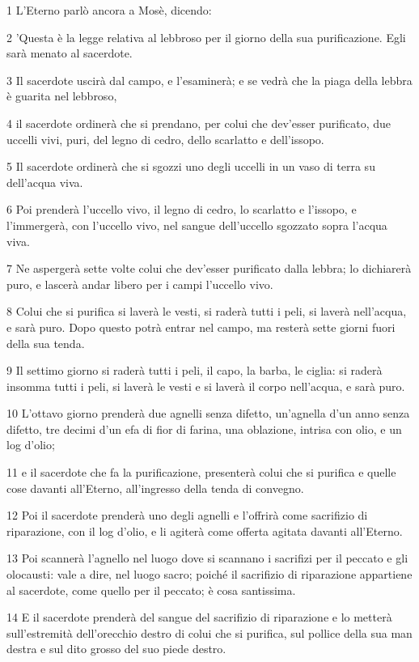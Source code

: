 \par 1 L'Eterno parlò ancora a Mosè, dicendo:
\par 2 'Questa è la legge relativa al lebbroso per il giorno della sua purificazione. Egli sarà menato al sacerdote.
\par 3 Il sacerdote uscirà dal campo, e l'esaminerà; e se vedrà che la piaga della lebbra è guarita nel lebbroso,
\par 4 il sacerdote ordinerà che si prendano, per colui che dev'esser purificato, due uccelli vivi, puri, del legno di cedro, dello scarlatto e dell'issopo.
\par 5 Il sacerdote ordinerà che si sgozzi uno degli uccelli in un vaso di terra su dell'acqua viva.
\par 6 Poi prenderà l'uccello vivo, il legno di cedro, lo scarlatto e l'issopo, e l'immergerà, con l'uccello vivo, nel sangue dell'uccello sgozzato sopra l'acqua viva.
\par 7 Ne aspergerà sette volte colui che dev'esser purificato dalla lebbra; lo dichiarerà puro, e lascerà andar libero per i campi l'uccello vivo.
\par 8 Colui che si purifica si laverà le vesti, si raderà tutti i peli, si laverà nell'acqua, e sarà puro. Dopo questo potrà entrar nel campo, ma resterà sette giorni fuori della sua tenda.
\par 9 Il settimo giorno si raderà tutti i peli, il capo, la barba, le ciglia: si raderà insomma tutti i peli, si laverà le vesti e si laverà il corpo nell'acqua, e sarà puro.
\par 10 L'ottavo giorno prenderà due agnelli senza difetto, un'agnella d'un anno senza difetto, tre decimi d'un efa di fior di farina, una oblazione, intrisa con olio, e un log d'olio;
\par 11 e il sacerdote che fa la purificazione, presenterà colui che si purifica e quelle cose davanti all'Eterno, all'ingresso della tenda di convegno.
\par 12 Poi il sacerdote prenderà uno degli agnelli e l'offrirà come sacrifizio di riparazione, con il log d'olio, e li agiterà come offerta agitata davanti all'Eterno.
\par 13 Poi scannerà l'agnello nel luogo dove si scannano i sacrifizi per il peccato e gli olocausti: vale a dire, nel luogo sacro; poiché il sacrifizio di riparazione appartiene al sacerdote, come quello per il peccato; è cosa santissima.
\par 14 E il sacerdote prenderà del sangue del sacrifizio di riparazione e lo metterà sull'estremità dell'orecchio destro di colui che si purifica, sul pollice della sua man destra e sul dito grosso del suo piede destro.
